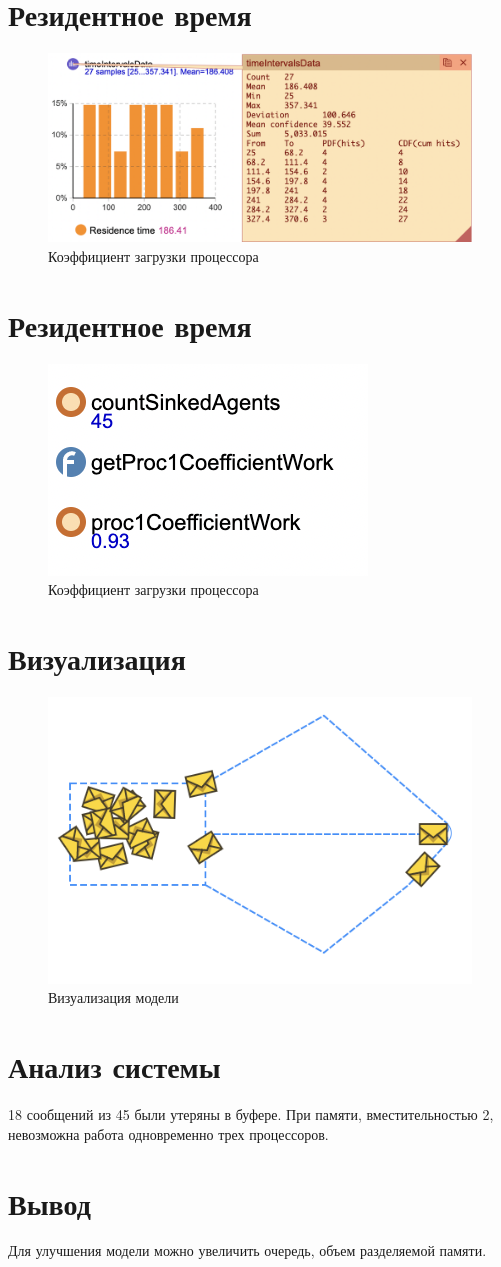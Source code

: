 \documentclass[14pt, a4paper, titlepage]{extarticle}
\begin{document}
	
	\section{Резидентное время}
	
	\begin{figure}[H]
		\centering
		\includegraphics[width=.9\textwidth]{residenttime}
		\caption{Коэффициент загрузки процессора}
	\end{figure}
	
	\section{Резидентное время}
	
	\begin{figure}[H]
		\centering
		\includegraphics[width=.3\textwidth]{coef}
		\caption{Коэффициент загрузки процессора}
	\end{figure}
	
	\section{Визуализация}
	
	\begin{figure}[H]
		\centering
		\includegraphics[width=.5\textwidth]{visualisation}
		\caption{Визуализация модели}
	\end{figure}
	
	
	

	
	\section{Анализ системы}
	
	18 сообщений из 45 были утеряны в буфере. При памяти, вместительностью 2, невозможна работа одновременно трех процессоров.
	
	\section{Вывод}
	
	Для улучшения модели можно увеличить очередь, объем разделяемой памяти.
	
	
\end{document}
